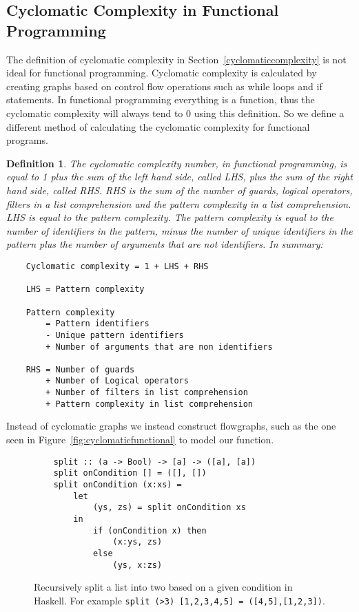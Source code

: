 \documentclass[12pt]{report}
\newtheorem*{definition}{Definition}
\theoremstyle{definition}
\theoremstyle{theorem}
\begin{document}
\subsection{Cyclomatic Complexity in Functional
Programming}

The definition of cyclomatic complexity in Section~\ref{cyclomaticcomplexity} is
not ideal for functional programming. Cyclomatic complexity is calculated by
creating graphs based on control flow operations such as while loops and if
statements. In functional programming everything is a function, thus the
cyclomatic complexity will always tend to 0 using this definition. So we define
a different method of calculating the cyclomatic complexity for functional
programs. 

\theoremstyle{definition} 
    \begin{definition} 
    The cyclomatic complexity number, in functional programming, is equal to
    1 plus the sum of the left hand side, called LHS, plus the sum of the
    right hand side, called RHS. RHS is the sum of the number of guards,
    logical operators, filters in a list comprehension and the pattern
    complexity in a list comprehension. LHS is equal to the pattern
    complexity.  The pattern complexity is equal to the number of
    identifiers in the pattern, minus the number of unique identifiers in
    the pattern plus the number of arguments that are not identifiers. In
    summary:

    \begin{lstlisting}
    Cyclomatic complexity = 1 + LHS + RHS

    LHS = Pattern complexity 

    Pattern complexity   
        = Pattern identifiers 
        - Unique pattern identifiers 
        + Number of arguments that are non identifiers

    RHS = Number of guards 
        + Number of Logical operators 
        + Number of filters in list comprehension 
        + Pattern complexity in list comprehension
    \end{lstlisting}
\end{definition}

Instead of cyclomatic graphs we instead construct flowgraphs, such as the one
seen in Figure~\ref{fig:cyclomaticfunctional} to model our function.

\begin{figure}[H]
    \begin{lstlisting}
    split :: (a -> Bool) -> [a] -> ([a], [a])
    split onCondition [] = ([], [])
    split onCondition (x:xs) =
        let 
            (ys, zs) = split onCondition xs
        in 
            if (onCondition x) then 
                (x:ys, zs)
            else 
                (ys, x:zs)
    \end{lstlisting}
    \label{split}
    \caption{Recursively split a list into two based on a given condition in
    Haskell. For example \texttt{split (>3) [1,2,3,4,5] =
    ([4,5],[1,2,3])}.}
\end{figure}
\end{document}
